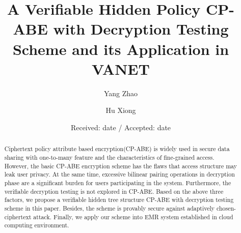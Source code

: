 \documentclass[smallextended]{svjour3}       %
\begin{document}
\title{A Verifiable Hidden Policy CP-ABE with Decryption Testing Scheme and its Application in VANET}


\author{ 
	Yang  Zhao \and %
	Hu Xiong 
}
\clearpage




\date{Received: date / Accepted: date}

\maketitle

\begin{abstract}
	Ciphertext policy attribute based encryption(CP-ABE) is widely used in secure data sharing with one-to-many feature and the characteristics of fine-grained access. 
	However, the basic CP-ABE encryption scheme has the flaws that access structure may leak user privacy.
	At the same time, excessive bilinear pairing operations in decryption phase are a significant burden for users participating in the system. 
	Furthermore, the verifiable decryption testing is not explored in CP-ABE.
	Based on the above three factors, we propose a verifiable hidden tree structure CP-ABE with decryption testing scheme in this paper.
	Besides, the scheme is provably secure against adaptively chosen-ciphertext attack. 
	Finally, we apply our scheme into EMR system established in cloud computing environment.
\end{abstract}
\end{document}
